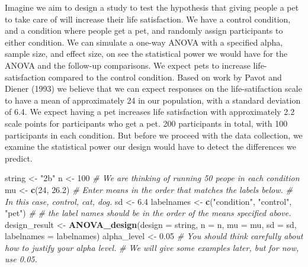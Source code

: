 \documentclass[]{book}
\newenvironment{Shaded}{\begin{snugshade}}{\end{snugshade}}
\newcommand{\CommentTok}[1]{\textcolor[rgb]{0.56,0.35,0.01}{\textit{#1}}}
\newcommand{\DataTypeTok}[1]{\textcolor[rgb]{0.13,0.29,0.53}{#1}}
\newcommand{\DecValTok}[1]{\textcolor[rgb]{0.00,0.00,0.81}{#1}}
\newcommand{\FloatTok}[1]{\textcolor[rgb]{0.00,0.00,0.81}{#1}}
\newcommand{\KeywordTok}[1]{\textcolor[rgb]{0.13,0.29,0.53}{\textbf{#1}}}
\newcommand{\NormalTok}[1]{#1}
\newcommand{\StringTok}[1]{\textcolor[rgb]{0.31,0.60,0.02}{#1}}
\begin{document}
Imagine we aim to design a study to test the hypothesis that giving people a pet to take care of will increase their life satisfaction. We have a control condition, and a condition where people get a pet, and randomly assign participants to either condition. We can simulate a one-way ANOVA with a specified alpha, sample size, and effect size, on see the statistical power we would have for the ANOVA and the follow-up comparisons. We expect pets to increase life-satisfaction compared to the control condition. Based on work by Pavot and Diener (1993) we believe that we can expect responses on the life-satifaction scale to have a mean of approximately 24 in our population, with a standard deviation of 6.4. We expect having a pet increases life satisfaction with approximately 2.2 scale points for participants who get a pet. 200 participants in total, with 100 participants in each condition. But before we proceed with the data collection, we examine the statistical power our design would have to detect the differences we predict.

\begin{Shaded}
\begin{Highlighting}[]
\NormalTok{string <-}\StringTok{ "2b"}
\NormalTok{n <-}\StringTok{ }\DecValTok{100}
\CommentTok{# We are thinking of running 50 peope in each condition}
\NormalTok{mu <-}\StringTok{ }\KeywordTok{c}\NormalTok{(}\DecValTok{24}\NormalTok{, }\FloatTok{26.2}\NormalTok{)}
\CommentTok{# Enter means in the order that matches the labels below.}
\CommentTok{# In this case, control, cat, dog. }
\NormalTok{sd <-}\StringTok{ }\FloatTok{6.4}
\NormalTok{labelnames <-}\StringTok{ }\KeywordTok{c}\NormalTok{(}\StringTok{"condition"}\NormalTok{, }\StringTok{"control"}\NormalTok{, }\StringTok{"pet"}\NormalTok{) }\CommentTok{#}
\CommentTok{# the label names should be in the order of the means specified above.}
\NormalTok{design_result <-}\StringTok{ }\KeywordTok{ANOVA_design}\NormalTok{(}\DataTypeTok{design =}\NormalTok{ string,}
                   \DataTypeTok{n =}\NormalTok{ n, }
                   \DataTypeTok{mu =}\NormalTok{ mu, }
                   \DataTypeTok{sd =}\NormalTok{ sd, }
                   \DataTypeTok{labelnames =}\NormalTok{ labelnames)}
\NormalTok{alpha_level <-}\StringTok{ }\FloatTok{0.05}
\CommentTok{# You should think carefully about how to justify your alpha level.}
\CommentTok{# We will give some examples later, but for now, use 0.05.}
\end{Highlighting}
\end{Shaded}
\end{document}
